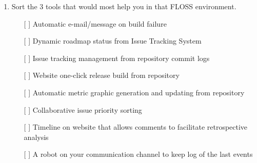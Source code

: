 \documentclass[lnbip]{svmultln}
\begin{document}
\begin{small}
\begin{enumerate}
  \item Sort the 3 tools that would most help you in that FLOSS
    environment.
    \begin{itemize}
    \item[[ ] ] Automatic e-mail/message on build failure
    \item[[ ] ] Dynamic roadmap status from Issue Tracking System
    \item[[ ] ] Issue tracking management from repository commit logs
    \item[[ ] ] Website one-click release build from repository
    \item[[ ] ] Automatic metric graphic generation and updating from
      repository
    \item[[ ] ] Collaborative issue priority sorting
    \item[[ ] ] Timeline on website that allows comments to
      facilitate retrospective analysis
    \item[[ ] ] A robot on your communication channel to keep log of
      the last events
    \end{itemize}
  \end{enumerate}
\end{small}
\end{document}
